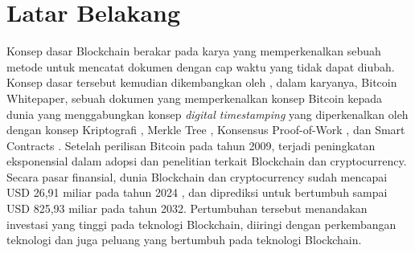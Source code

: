 \section{Latar Belakang}
\label{sec:latarbelakang}

Konsep dasar Blockchain berakar pada karya \cite{haber1991time} yang memperkenalkan sebuah metode untuk mencatat dokumen dengan cap waktu yang tidak dapat diubah. Konsep dasar tersebut kemudian dikembangkan oleh \cite{nakamoto2008bitcoin}, dalam karyanya, Bitcoin Whitepaper, sebuah dokumen yang memperkenalkan konsep Bitcoin kepada dunia yang menggabungkan konsep \textit{digital timestamping} yang diperkenalkan oleh \cite{haber1991time} dengan konsep Kriptografi \parencite{hellman1976new} \parencite{standard1995secure}, Merkle Tree \parencite{merkle1987digital}, Konsensus Proof-of-Work \parencite{dwork1992pricing}, dan Smart Contracts \parencite{szabo1997formalizing}. Setelah perilisan Bitcoin pada tahun 2009, terjadi peningkatan eksponensial dalam adopsi dan penelitian terkait Blockchain dan cryptocurrency. Secara pasar finansial, dunia Blockchain dan cryptocurrency sudah mencapai USD 26,91 miliar pada tahun 2024 \parencite{rosencrance2024top}, dan diprediksi untuk bertumbuh sampai USD 825,93 miliar pada tahun 2032. Pertumbuhan tersebut menandakan investasi yang tinggi pada teknologi Blockchain, diiringi dengan perkembangan teknologi dan juga peluang yang bertumbuh pada teknologi Blockchain.


